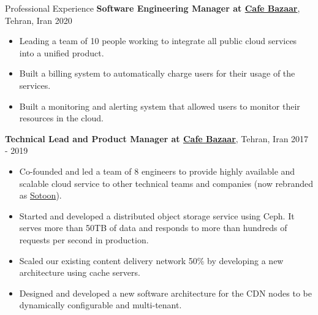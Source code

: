 \documentclass{resume} %
\begin{document}
\begin{rSection}{Professional Experience}
	{\bf Software Engineering Manager at \href{https://cafebazaar.ir/app?l=en}{Cafe Bazaar}}, Tehran, Iran \hfill 2020
	\smallskip
	\vspace{-0.5em}
	\begin{itemize}[leftmargin=3mm]
		\setlength{\itemsep}{1pt}
		\setlength{\parskip}{0pt}
		\setlength{\parsep}{0pt}
		\renewcommand\labelitemi{$\cdot$}

		\item Leading a team of 10 people working to integrate all public cloud services 
            into a unified product.
		\item Built a billing system to automatically charge users for
            their usage of the services.
		\item Built a monitoring and alerting system that allowed users
            to monitor their resources in the cloud.
	\end{itemize}
	
	{\bf Technical Lead and Product Manager at \href{https://cafebazaar.ir/app?l=en}{Cafe Bazaar}}, Tehran, Iran \hfill 2017 - 2019
	\smallskip
	\vspace{-0.5em}
	\begin{itemize}[leftmargin=3mm]
		\setlength{\itemsep}{1pt}
		\setlength{\parskip}{0pt}
		\setlength{\parsep}{0pt}
		\renewcommand\labelitemi{$\cdot$}

		\item Co-founded and led a team of 8 engineers to provide highly available and 
            scalable cloud service to other technical teams and companies (now rebranded 
            as \href{https://sotoon.ir/}{Sotoon}).
		\item Started and developed a distributed object storage service using Ceph. 
            It serves more than 50TB of data and responds to more than hundreds of 
            requests per second in production.
		\item Scaled our existing content delivery network 50\% by developing a new 
            architecture using cache servers.
		\item Designed and developed a new software architecture for the CDN nodes to be 
            dynamically configurable and multi-tenant.%
	\end{itemize}
	

\end{rSection}
\end{document}
